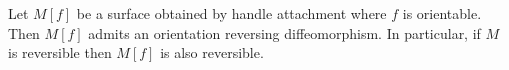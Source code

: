 Let $M[f]$ be a surface obtained by handle attachment where $f$ is orientable. Then $M[f]$ admits an orientation reversing diffeomorphism. In particular, if $M$ is reversible then $M[f]$ is also reversible.
